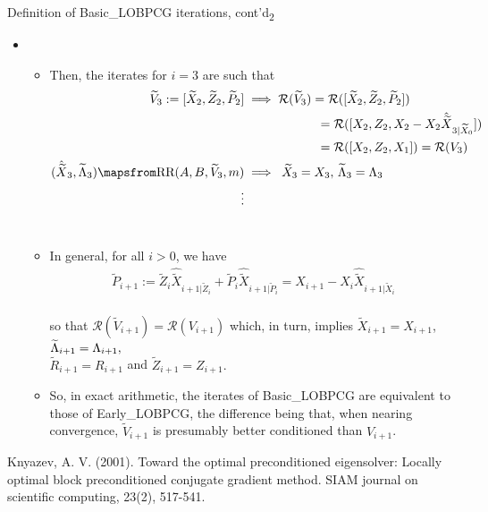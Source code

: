 \documentclass[t,usepdftitle=false]{beamer}
\begin{document}
\begin{frame}{Definition of Basic\_LOBPCG iterations, cont'd\textsubscript{2}}
	\begin{itemize}
	\item[]
	\begin{itemize}
	\item Then, the iterates for $i=3$ are such that\vspace{-.1cm}
	\begin{align*}
	\widetilde{V}_3:=[\widetilde{X}_2,\widetilde{Z}_2,\widetilde{P}_2]
	&\implies\mathcal{R}(\widetilde{V}_3)=\mathcal{R}([\widetilde{X}_2,\widetilde{Z}_2,\widetilde{P}_2])\\
	&\hspace{2.05cm}=\mathcal{R}([X_2,Z_2,X_2-X_2\hat{\widetilde{X}}_{3|\widetilde{X}_0}])\\
	&\hspace{2.05cm}=\mathcal{R}([X_2,Z_2,X_1])=\mathcal{R}(V_3)\\
	(\hat{\widetilde{X}}_3,\widetilde{\Lambda}_3)\mapsfrom\text{RR}(A,B,\widetilde{V}_{3},m)
	&\implies\;\widetilde{X}_3=X_3,\,\widetilde{\Lambda}_3=\Lambda_3\\
	\;\;\;\;\vdots
	\end{align*}
	\vspace{-.65cm}\\	
	\item In general, for all $i>0$, we have\vspace{-.1cm}
	\begin{align*}
	\widetilde{P}_{i+1}:=
	\widetilde{Z}_i\hat{\widetilde{X}}_{i+1|\widetilde{Z}_i}+\widetilde{P}_i\hat{\widetilde{X}}_{i+1|\widetilde{P}_i}=
	X_{i+1}-X_i\hat{\widetilde{X}}_{i+1|\widetilde{X}_i}
	\end{align*}
	\vspace{-.5cm}\\
	so that $\mathcal{R}(\widetilde{V}_{i+1})\!=\!\mathcal{R}(V_{i+1})$ which, in turn, implies
	$\widetilde{X}_{i+1}=X_{i+1}$, $\widetilde{\Lambda}_{i+1}=\Lambda_{i+1},\hspace{-1cm}$\\ $\widetilde{R}_{i+1}=R_{i+1}$ and $\widetilde{Z}_{i+1}=Z_{i+1}.$\smallskip
	\item So, in exact arithmetic, the iterates of Basic\_LOBPCG are equivalent to those of Early\_LOBPCG, the difference being that, when nearing convergence, $\widetilde{V}_{i+1}$ is presumably better conditioned than $V_{i+1}$.
	\end{itemize}
	\end{itemize}
	\smallskip
	\tiny{Knyazev, A. V. (2001). Toward the optimal preconditioned eigensolver: Locally optimal block preconditioned conjugate gradient method. SIAM journal on scientific computing, 23(2), 517-541.}
\end{frame}
\end{document}

